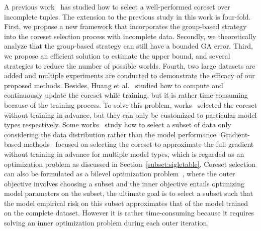  A previous work~\cite{goodcore} has studied how to select a well-performed coreset over incomplete tuples. The extension to the previous study in this work is four-fold. First, we propose a new framework that incorporates the group-based strategy into the coreset selection process with incomplete data. Secondly, we theoretically analyze that the group-based strategy can still have a bounded GA error. Third, we propose an efficient solution to estimate the upper bound, and several strategies to reduce the number of possible worlds. Fourth, two large datasets are added and multiple experiments are conducted to demonstrate the efficacy of our proposed methods. 
%
%
Besides, 
  Huang et al.~\cite{DBLP:conf/icml/HuangHLFD21} studied how to compute and continuously update the coreset while training, %
but it is rather time-consuming because of the training process. 
 To solve this problem, works~\cite{DBLP:conf/icml/CampbellB18, DBLP:journals/corr/BravermanFL16}   selected the coreset without training in advance, but they can only be customized to particular model types respectively. %
 Some works~\cite{sener2017active,chen2012super, Zhang2019SmallGAN, Agarwal2020Context} study how to select a subset of data only considering the data distribution rather than   the model performance.
 Gradient-based methods~\cite{DBLP:conf/icml/MirzasoleimanBL20,  recon, DBLP:conf/emnlp/KirchhoffB14, Mirzasoleiman2020Coresetnoisy,  fastcore} focused on selecting the coreset to approximate the full gradient without training in advance for multiple model types, which is regarded as an optimization problem as discussed in Section~\ref{subset:sigletable}.
 Coreset selection can also be formulated as a bilevel optimization problem~\cite{borsos2020coresets, killamsetty2021retrieve, Killamsetty2022GLISTER}, where the outer objective involves choosing a subset and the inner objective entails optimizing model parameters on the subset, the ultimate goal is to select a subset such that the model empirical risk on this subset  approximates that of the model trained on the complete dataset. However it is rather time-consuming because it requires solving an inner optimization problem during each outer iteration. 
 
